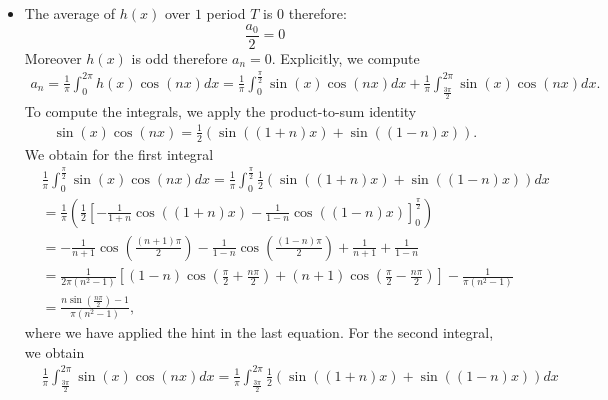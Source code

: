 \documentclass[11pt]{article}
\begin{document}
\begin{solution}
\begin{itemize}
\begin{align*}
\begin{cases}
                \end{cases}
            \right)
            \cdot 
            \left(
                \begin{cases}
                    -1 & \text{ if $n$ is odd } 
                    \\ 
                    1 & \text{ if $n$ is even } 
                \end{cases}
            \right)
            =  
            -\frac{2\pi^2}{n}+\frac{12}{n^3}
            .
    \end{align*}
    \item 
    The average of $h(x)$ over $1$ period $T$ is $0$ therefore:
    \[
        \frac{a_0}{2} = 0
    \]
    Moreover $h(x)$ is odd therefore $a_n = 0$. Explicitly, we compute
    \begin{align*}
        a_n = \frac 1 \pi \int_0^{2 \pi} h(x) \cos(n x) dx = \frac 1 \pi \int_0^{\frac \pi 2} \sin(x) \cos(n x) dx + \frac 1 \pi \int_{\frac {3 \pi} 2}^{2 \pi} \sin(x) \cos(n x) dx.
    \end{align*}
    To compute the integrals, we apply the product-to-sum identity
    \begin{align*}
        \sin(x) \cos(n x) = \frac 1 2 \left( \sin((1 + n)x) + \sin((1 - n)x) \right).
    \end{align*}
    We obtain for the first integral
    \begin{align*}
        &\frac 1 \pi \int_0^{\frac \pi 2} \sin(x) \cos(n x) dx = \frac 1 \pi \int_0^{\frac \pi 2} \frac 1 2 \left( \sin((1 + n)x) + \sin((1 - n)x) \right) dx\\
        &= \frac 1 \pi \left( \frac 1 2 \left[ -\frac 1 {1 + n} \cos((1 + n)x) - \frac 1 {1 - n} \cos((1 - n)x) \right]_0^{\frac \pi 2} \right)\\
        &= -\frac{1}{n+1}\cos\left( \frac{(n+1) \pi}{2}\right) - \frac{1}{1 - n} \cos \left(\frac{(1 - n) \pi}{2} \right) + \frac{1}{n + 1} + \frac{1}{1 - n}\\
        &= \frac{1}{2 \pi (n^2 - 1)} \left[(1-n)\cos\left( \frac{\pi}{2} + \frac{n \pi}{2}\right) + (n + 1) \cos\left(\frac{\pi}{2} - \frac{n\pi}{2} \right)\right] - \frac{1}{\pi(n^2 - 1)}\\
        &= \frac{n \sin\left( \frac{n \pi}{2}\right) - 1}{\pi(n^2 - 1)},
    \end{align*}
    where we have applied the hint in the last equation. For the second integral, we obtain
    \begin{align*}
        &\frac 1 \pi \int_{\frac {3 \pi} 2}^{2 \pi} \sin(x) \cos(n x) dx = \frac 1 \pi \int_{\frac {3 \pi} 2}^{2 \pi} \frac 1 2 \left( \sin((1 + n)x) + \sin((1 - n)x) \right) dx\\

\end{align*}
\end{itemize}
\end{solution}
\end{document}
